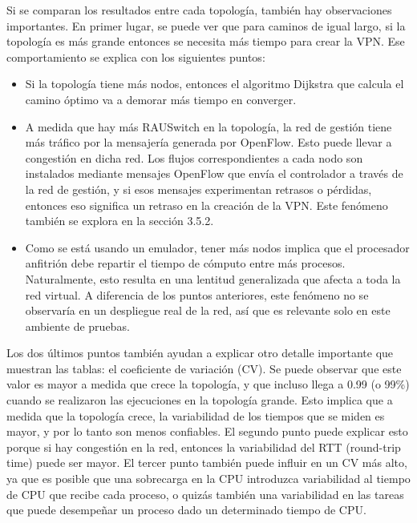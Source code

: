 Si se comparan los resultados entre cada topología, también hay observaciones importantes. En primer lugar, se puede ver que para caminos de igual largo, si la topología es más grande entonces se necesita más tiempo para crear la VPN. Ese comportamiento se explica con los siguientes puntos:
\begin{itemize}
	\item Si la topología tiene más nodos, entonces el algoritmo Dijkstra que calcula el camino óptimo va a demorar más tiempo en converger.
	\item A medida que hay más RAUSwitch en la topología, la red de gestión tiene más tráfico por la mensajería generada por OpenFlow. Esto puede llevar a congestión en dicha red. Los flujos correspondientes a cada nodo son instalados mediante mensajes OpenFlow que envía el controlador a través de la red de gestión, y si esos mensajes experimentan retrasos o pérdidas, entonces eso significa un retraso en la creación de la VPN. Este fenómeno también se explora en la sección 3.5.2.
	\item Como se está usando un emulador, tener más nodos implica que el procesador anfitrión debe repartir el tiempo de cómputo entre más procesos. Naturalmente, esto resulta en una lentitud generalizada que afecta a toda la red virtual. A diferencia de los puntos anteriores, este fenómeno no se observaría en un despliegue real de la red, así que es relevante solo en este ambiente de pruebas.
\end{itemize}
Los dos últimos puntos también ayudan a explicar otro detalle importante que muestran las tablas: el coeficiente de variación (CV). Se puede observar que este valor es mayor a medida que crece la topología, y que incluso llega a 0.99 (o 99\%) cuando se realizaron las ejecuciones en la topología grande. Esto implica que a medida que la topología crece, la variabilidad de los tiempos que se miden es mayor, y por lo tanto son menos confiables.
El segundo punto puede explicar esto porque si hay congestión en la red, entonces la variabilidad del RTT (round-trip time) puede ser mayor. El tercer punto también puede influir en un CV más alto, ya que es posible que una sobrecarga en la CPU introduzca variabilidad al tiempo de CPU que recibe cada proceso, o quizás también una variabilidad en las tareas que puede desempeñar un proceso dado un determinado tiempo de CPU. \\

